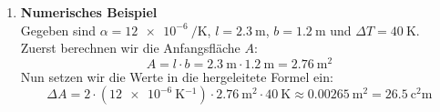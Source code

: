 \documentclass[ngerman]{scrreprt}
\newenvironment{loesungbox}[1]
  {\needspace{5\baselineskip}\begin{loesungboxstyle}[frametitle={#1}]}
  {\end{loesungboxstyle}}
\begin{document}
\begin{loesungbox}{Lösung zu \Cref{aufg:thermische_ausdehnung_flaeche}}
\begin{enumerate}
    \item \textbf{Numerisches Beispiel} \\
    Gegeben sind $\alpha = \SI{12e-6}{\per\kelvin}$, $l = \SI{2.3}{\meter}$, $b = \SI{1.2}{\meter}$ und $\Delta T = \SI{40}{\kelvin}$. Zuerst berechnen wir die Anfangsfläche $A$:
    \begin{equation}
        A = l \cdot b = \SI{2.3}{\m} \cdot \SI{1.2}{\m} = \SI{2.76}{\square\meter}
    \end{equation}
    Nun setzen wir die Werte in die hergeleitete Formel  ein:
    \begin{equation}
        \Delta A = 2 \cdot (\SI{12e-6}{\kelvin^{-1}}) \cdot \SI{2.76}{\square\meter} \cdot \SI{40}{\kelvin} \approx \SI{0.00265}{\square\meter} = \SI{26.5}{\square\centi\meter}
    \end{equation}
\end{enumerate}
\end{loesungbox}
\end{document}
